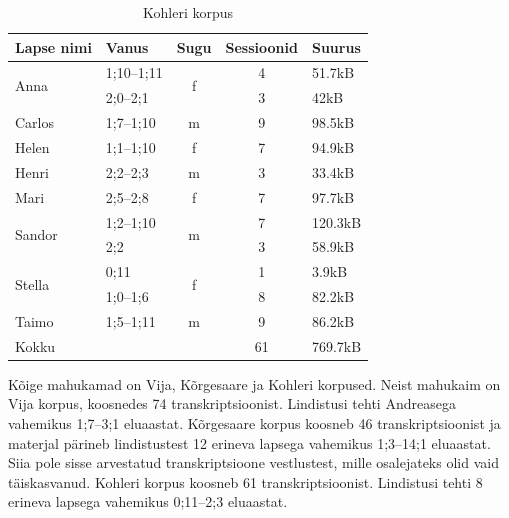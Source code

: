 \documentclass[12pt]{article}
\begin{document}
\begin{table}[H]
\centering
\caption{Kohleri korpus}
\begin{tabular}{|l|l|c|c|l|}
\hline
Lapse nimi              & Vanus      & \multicolumn{1}{l|}{Sugu} & \multicolumn{1}{l|}{Sessioonid} & Suurus \\ \hline\hline
\multirow{2}{*}{Anna}   & 1;10--1;11 & \multirow{2}{*}{f}        & 4                               & 51.7kB   \\ \cline{2-2} \cline{4-5} 
                        & 2;0--2;1   &                           & 3                               & 42kB     \\ \hline
Carlos                  & 1;7--1;10  & m                         & 9                               & 98.5kB   \\ \hline
Helen                   & 1;1--1;10  & f                         & 7                               & 94.9kB   \\ \hline
Henri                   & 2;2--2;3   & m                         & 3                               & 33.4kB   \\ \hline
Mari                    & 2;5--2;8   & f                         & 7                               & 97.7kB   \\ \hline
\multirow{2}{*}{Sandor} & 1;2--1;10  & \multirow{2}{*}{m}        & 7                               & 120.3kB  \\ \cline{2-2} \cline{4-5} 
                        & 2;2        &                           & 3                               & 58.9kB   \\ \hline
\multirow{2}{*}{Stella} & 0;11       & \multirow{2}{*}{f}        & 1                               & 3.9kB    \\ \cline{2-2} \cline{4-5} 
                        & 1;0--1;6   &                           & 8                               & 82.2kB   \\ \hline
Taimo                   & 1;5--1;11  & m                         & 9                               & 86.2kB   \\ \hline
Kokku                   & \multicolumn{2}{l|}{}                  & 61                              & 769.7kB  \\ \hline
\end{tabular}
\end{table}

Kõige mahukamad on Vija, Kõrgesaare ja Kohleri korpused. Neist mahukaim on Vija korpus, koosnedes 74 transkriptsioonist. Lindistusi tehti Andreasega vahemikus 1;7--3;1 eluaastat. Kõrgesaare korpus koosneb 46 transkriptsioonist ja materjal pärineb lindistustest 12 erineva lapsega vahemikus 1;3--14;1 eluaastat. Siia pole sisse arvestatud transkriptsioone vestlustest, mille osalejateks olid vaid täiskasvanud. Kohleri korpus koosneb 61 transkriptsioonist. Lindistusi tehti 8 erineva lapsega vahemikus 0;11--2;3 eluaastat.
\end{document}

